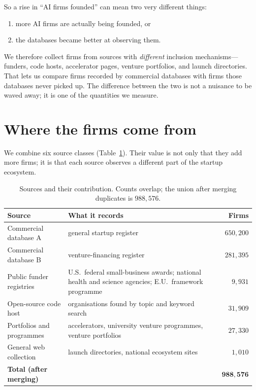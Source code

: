 \documentclass[11pt]{article}
\begin{document}
So a rise in ``AI firms founded'' can mean two very different things:

\begin{enumerate}[leftmargin=1.4em, itemsep=2pt]
  \item more AI firms are actually being founded, or
  \item the databases became better at observing them.
\end{enumerate}

\noindent
We therefore collect firms from sources with \emph{different} inclusion
mechanisms---funders, code hosts, accelerator pages, venture portfolios, and
launch directories. That lets us compare firms recorded by commercial
databases with firms those databases never picked up. The difference between
the two is not a nuisance to be waved away; it is one of the quantities we
measure.

\section{Where the firms come from}

We combine six source classes (Table~\ref{tab:sources}). Their value is not
only that they add more firms; it is that each source observes a different
part of the startup ecosystem.

\begin{table}[htbp]
\centering\small
\caption{Sources and their contribution. Counts overlap; the union after
merging duplicates is $988{,}576$.}
\label{tab:sources}
\begin{tabular}{@{}p{3.5cm}p{5.4cm}r@{}}
\toprule
\textbf{Source} & \textbf{What it records} & \textbf{Firms} \\
\midrule
Commercial database A & general startup register & $650{,}200$ \\
Commercial database B & venture-financing register & $281{,}395$ \\
Public funder registries & U.S.\ federal small-business awards; national
health and science agencies; E.U.\ framework programme & $9{,}931$ \\
Open-source code host & organisations found by topic and keyword search &
$31{,}909$ \\
Portfolios and programmes & accelerators, university venture programmes,
venture portfolios & $27{,}330$ \\
General web collection & launch directories, national ecosystem sites &
$1{,}010$ \\
\midrule
\textbf{Total (after merging)} & & $\mathbf{988{,}576}$ \\
\bottomrule
\end{tabular}
\end{table}
\end{document}
